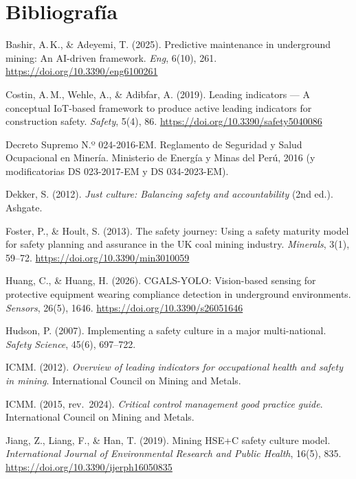 \documentclass[12pt,a4paper]{article}
\begin{document}
\section{Bibliografía}

\begingroup
\small
\setlength{\parskip}{4pt}
\setlength{\parindent}{0pt}
\renewcommand{\baselinestretch}{1.0}\selectfont

Bashir, A.\,K., \& Adeyemi, T. (2025). Predictive maintenance in underground mining: An AI-driven framework. \textit{Eng}, 6(10), 261. \url{https://doi.org/10.3390/eng6100261}

Costin, A.\,M., Wehle, A., \& Adibfar, A. (2019). Leading indicators --- A conceptual IoT-based framework to produce active leading indicators for construction safety. \textit{Safety}, 5(4), 86. \url{https://doi.org/10.3390/safety5040086}

Decreto Supremo N.º 024-2016-EM. Reglamento de Seguridad y Salud Ocupacional en Minería. Ministerio de Energía y Minas del Perú, 2016 (y modificatorias DS 023-2017-EM y DS 034-2023-EM).

Dekker, S. (2012). \textit{Just culture: Balancing safety and accountability} (2nd ed.). Ashgate.

Foster, P., \& Hoult, S. (2013). The safety journey: Using a safety maturity model for safety planning and assurance in the UK coal mining industry. \textit{Minerals}, 3(1), 59--72. \url{https://doi.org/10.3390/min3010059}

Huang, C., \& Huang, H. (2026). CGALS-YOLO: Vision-based sensing for protective equipment wearing compliance detection in underground environments. \textit{Sensors}, 26(5), 1646. \url{https://doi.org/10.3390/s26051646}

Hudson, P. (2007). Implementing a safety culture in a major multi-national. \textit{Safety Science}, 45(6), 697--722.

ICMM. (2012). \textit{Overview of leading indicators for occupational health and safety in mining}. International Council on Mining and Metals.

ICMM. (2015, rev.\ 2024). \textit{Critical control management good practice guide}. International Council on Mining and Metals.

Jiang, Z., Liang, F., \& Han, T. (2019). Mining HSE+C safety culture model. \textit{International Journal of Environmental Research and Public Health}, 16(5), 835. \url{https://doi.org/10.3390/ijerph16050835}
\end{document}
